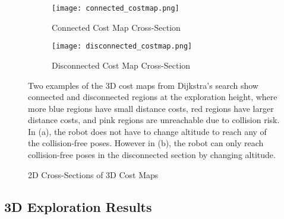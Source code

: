 \begin{figure}[!t]
\centering
    	\begin{subfigure}[t]{0.8\columnwidth}
           	\centering
          	\texttt{[image: connected\_costmap.png]}
        		\caption{Connected Cost Map Cross-Section}
    	\end{subfigure}
    	\begin{subfigure}[t]{0.8\columnwidth}
           	\centering
          	\texttt{[image: disconnected\_costmap.png]}
        		\caption{Disconnected Cost Map Cross-Section}
    	\end{subfigure}
	\caption{2D Cross-Sections of 3D Cost Maps}
	\medskip
	\small
	Two examples of the 3D cost maps from Dijkstra's search show connected and disconnected regions at the exploration height, where more blue regions have small distance costs, red regions have larger distance costs, and pink regions are unreachable due to collision risk. In (a), the robot does not have to change altitude to reach any of the collision-free poses. However in (b), the robot can only reach collision-free poses in the disconnected section by changing altitude.
	\label{fig:Full3DExplorationCostmaps}
\end{figure}

\subsection{3D Exploration Results}




